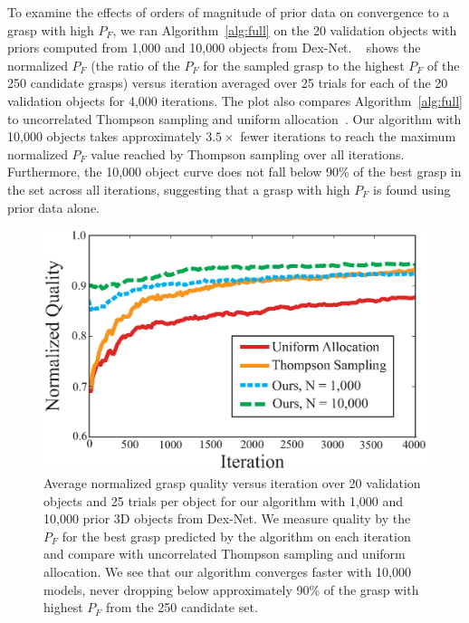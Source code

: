 To examine the effects of orders of magnitude of prior data on convergence to a grasp with high $P_F$, we ran Algorithm~\ref{alg:full} on the 20 validation objects with priors computed from 1,000 and 10,000 objects from Dex-Net. 
~ shows the normalized $P_F$ (the ratio of the $P_F$ for the sampled grasp to the highest $P_F$ of the 250 candidate grasps) versus iteration averaged over 25 trials for each of the 20 validation objects for 4,000 iterations.
The plot also compares Algorithm~\ref{alg:full} to uncorrelated Thompson sampling and uniform allocation~\cite{laskey2015bandits}.
Our algorithm with 10,000 objects takes approximately $3.5\times$ fewer iterations to reach the maximum normalized $P_F$ value reached by Thompson sampling over all iterations.
Furthermore, the 10,000 object curve does not fall below 90\% of the best grasp in the set across all iterations, suggesting that a grasp with high $P_F$ is found using prior data alone.

\begin{figure}[t!]
\centering
\includegraphics[scale=0.40]{figures/illustrations/avg_reward.eps}
\caption{Average normalized grasp quality versus iteration over 20 validation objects and 25 trials per object for our algorithm with 1,000 and 10,000 prior 3D objects from Dex-Net. We measure quality by the $P_F$ for the best grasp predicted by the algorithm on each iteration and compare with uncorrelated Thompson sampling and uniform allocation. We see that our algorithm converges faster with 10,000 models, never dropping below approximately 90\% of the grasp with highest $P_F$ from the 250 candidate set.}
\vspace*{-10pt}
\end{figure}

